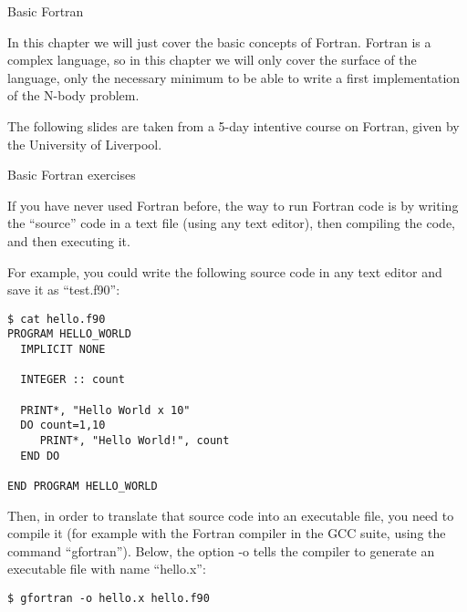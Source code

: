 
 {Basic Fortran}
\label{sec:basic-fortran}

In this chapter we will just cover the basic concepts of Fortran. Fortran is a
complex language, so in this chapter we will only cover the surface of the
language, only the necessary minimum to be able to write a first implementation
of the N-body problem.

The following slides are taken from a 5-day intentive course on Fortran, given by the
University of Liverpool.



 {Basic Fortran exercises}
\label{sec:basic-fortran-exercises}

If you have never used Fortran before, the way to run Fortran code is by writing
the ``source'' code in a text file (using any text editor), then compiling the
code, and then executing it.

For example, you could write the following source code in any text editor and
save it as ``test.f90'':

\begin{verbatim}
$ cat hello.f90
PROGRAM HELLO_WORLD
  IMPLICIT NONE

  INTEGER :: count

  PRINT*, "Hello World x 10"
  DO count=1,10
     PRINT*, "Hello World!", count
  END DO

END PROGRAM HELLO_WORLD
\end{verbatim}

Then, in order to translate that source code into an executable file, you need
to compile it (for example with the Fortran compiler in the GCC suite, using the
command ``gfortran''). Below, the option -o tells the compiler to generate an
executable file with name ``hello.x'':

\begin{verbatim}
$ gfortran -o hello.x hello.f90
\end{verbatim}

